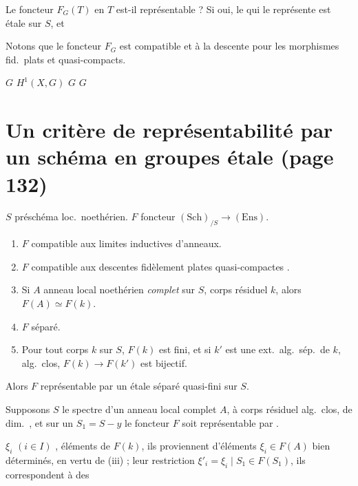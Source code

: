 \documentclass[11pt,a4paper]{article}
\begin{document}
Le foncteur $F_{G}(T)$ en $T$ \ill{} est-il représentable ? Si oui, le \ill{}
qui le représente est étale sur $S$, et \ill{} 

Notons que le foncteur $F_{G}$ \ill{} est compatible \ill{} et à la descente
pour les morphismes fid.\ plats \ill{} et quasi-compacts.

\struck{\ill{}} \quad $G$ \quad $H^{1}(X, G)$ \quad $G$ \quad $G$

\section*{Un critère de représentabilité par un schéma en groupes étale (page 132)}


$S$ préschéma loc.\ noethérien. $F$ foncteur $(\mathrm{Sch})_{/S} \to
(\mathrm{Ens})$.

\begin{enumerate}
\item[(i)] $F$ compatible aux limites inductives d'anneaux.
\item[(ii)] $F$ compatible aux descentes fidèlement plates quasi-compactes
.
\item[(iii)] Si $A$ anneau local noethérien \emph{complet} sur $S$, corps
résiduel $k$, alors $F(A) \simeq F(k)$.
\item[(iv)] $F$ séparé.
\item[(v)] Pour tout corps $k$ sur $S$, $F(k)$ est fini, et si $k'$ est une
ext.\ alg.\ sép.\ de $k$, \struck{\ill{}} alg.\ clos, $F(k) \to F(k')$ est
bijectif.
\end{enumerate}

Alors $F$ représentable par un \struck{\ill{}} \ill{} étale 
séparé quasi-fini sur $S$.


Supposons $S$ le spectre d'un anneau local complet $A$, à corps résiduel alg.\
clos, \struck{\ill{}} de dim.\ \ill{}, et \ill{} sur un $S_{1} = S - y$ le
foncteur $F$ soit représentable par \uncertain{$M_{1}$}. \struck{\ill{}}

$\xi_{i}$ \struck{\ill{}} $(i \in I)$ , éléments de $F(k)$, ils
proviennent d'éléments $\xi_{i} \in F(A)$ bien déterminés, en vertu de (iii) ;
leur restriction $\xi'_{i} = \xi_{i} \mid S_{1} \in F(S_{1})$, ils
correspondent à des \ill{}
\end{document}
